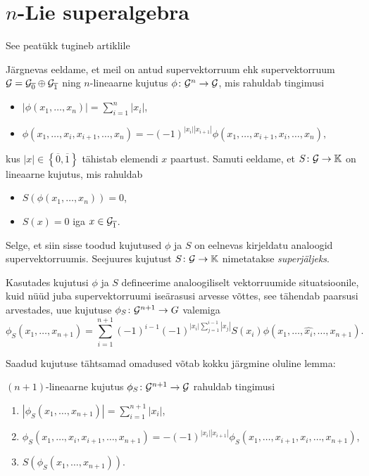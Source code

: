 

\section{\texorpdfstring{$n$}\ -Lie superalgebra}

See peatükk tugineb artiklile \cite{Abramov:2014}

Järgnevas eeldame, et meil on antud supervektorruum
ehk supervektorruum $\mathcal{G} = \mathcal{G}_{\overline{0}} \oplus \mathcal{G}_{\overline{1}}$
ning $n$-lineaarne kujutus $\phi \colon \mathcal{G}^n \rightarrow \mathcal{G}$, mis rahuldab
tingimusi
\begin{itemize}
    \item $| \phi(x_1, \dots, x_n) | = \sum_{i=1}^n |x_i|$,
    \item $ \phi \left( x_1, \dots, x_i, x_{i+1}, \dots, x_n \right) =
            -(-1)^{ |x_i| |x_{i+1}| } \phi \left(
                x_1, \dots, x_{i+1}, x_i, \dots, x_n \right), $
\end{itemize}
kus $|x| \in \left\{ \overline{0}, \overline{1} \right\}$
tähistab elemendi $x$ paartust. Samuti eeldame, et $S \colon \mathcal{G} \rightarrow \mathbb{K}$
on lineaarne kujutus, mis rahuldab
\begin{itemize}
    \item $S \left( \phi \left( x_1, \dots, x_n \right) \right) = 0$,
    \item $S(x) = 0$ iga $x \in \mathcal{G}_{\overline{1}}$.
\end{itemize}

Selge, et siin sisse toodud kujutused $\phi$ ja $S$ on eelnevas
kirjeldatu analoogid supervektorruumis. Seejuures kujutust $S \colon \mathcal{G} \rightarrow \mathbb{K}$
nimetatakse \emph{superjäljeks}.

Kasutades kujutusi $\phi$ ja $S$ defineerime analoogiliselt
vektorruumide situatsioonile, kuid nüüd juba supervektorruumi iseärasusi
arvesse võttes, see tähendab paarsusi arvestades, uue kujutuse
$\phi_S \colon \mathcal{G}^{n+1} \rightarrow G$ valemiga
\[
    \phi_S (x_1, \dots, x_{n+1}) =
    \sum_{i=1}^{n+1} (-1)^{i-1}(-1)^{|x_i| \sum_{j=1}^{i-1} |x_j| }
        S(x_i) \phi \left(
            x_1, \dots, \hat{x_i}, \dots, x_{n+1}
        \right).
\]

Saadud kujutuse tähtsamad omadused võtab kokku järgmine oluline lemma:

\begin{lemma}
    $(n+1)$-lineaarne kujutus $\phi_S \colon \mathcal{G}^{n+1} \rightarrow \mathcal{G}$
    rahuldab tingimusi
    \begin{enumerate}
        \item $ | \phi_S \left(x_1, \dots, x_{n+1} \right) | =
               \sum_{i=1}^{n+1} |x_i| $,
        \item $ \phi_S \left(x_1, \dots, x_i, x_{i+1}, \dots, x_{n+1} \right) =
               -(-1)^{|x_i| |x_{i+1}|} \phi_S \left(
                    x_1, \dots, x_{i+1}, x_i, \dots, x_{n+1}
                \right) $,
        \item $S \left( \phi_S \left( x_1, \dots, x_{n+1} \right) \right)$.
    \end{enumerate}
\end{lemma}

